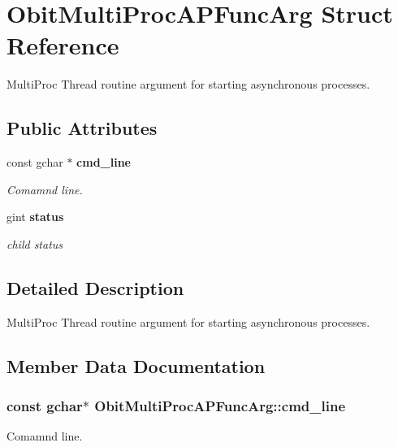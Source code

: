 \section{Obit\-Multi\-Proc\-APFunc\-Arg Struct Reference}
\label{structObitMultiProcAPFuncArg}
Multi\-Proc Thread routine argument for starting asynchronous processes.  


\subsection*{Public Attributes}
\begin{CompactItemize}
\item 
const gchar $\ast$ {\bf cmd\_\-line}
\begin{CompactList}\small\item\em Comamnd line. \item\end{CompactList}\item 
gint {\bf status}
\begin{CompactList}\small\item\em child status \item\end{CompactList}\end{CompactItemize}


\subsection{Detailed Description}
Multi\-Proc Thread routine argument for starting asynchronous processes. 



\subsection{Member Data Documentation}
\subsubsection{\setlength{\rightskip}{0pt plus 5cm}const gchar$\ast$ {\bf Obit\-Multi\-Proc\-APFunc\-Arg::cmd\_\-line}}\label{structObitMultiProcAPFuncArg_o0}


Comamnd line. 

